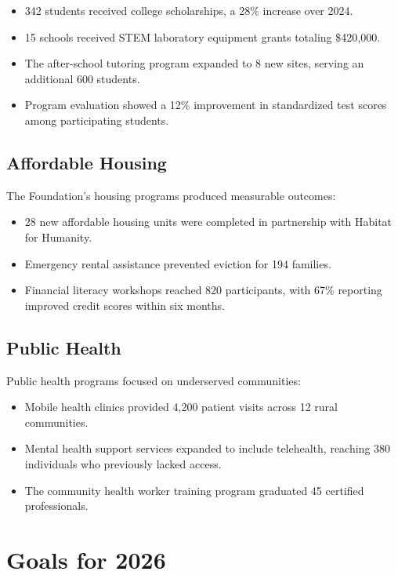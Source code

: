 \documentclass[
    language=english,
    doctype=article,
    institution=none,
]{../../omnilatex}
\begin{document}
\begin{itemize}
    \item 342 students received college scholarships, a 28\% increase
        over 2024.
    \item 15 schools received STEM laboratory equipment grants totaling
        \$420,000.
    \item The after-school tutoring program expanded to 8 new sites,
        serving an additional 600 students.
    \item Program evaluation showed a 12\% improvement in standardized
        test scores among participating students.
\end{itemize}

\subsection{Affordable Housing}

The Foundation's housing programs produced measurable outcomes:

\begin{itemize}
    \item 28 new affordable housing units were completed in partnership
        with Habitat for Humanity.
    \item Emergency rental assistance prevented eviction for 194 families.
    \item Financial literacy workshops reached 820 participants, with 67\%
        reporting improved credit scores within six months.
\end{itemize}

\subsection{Public Health}

Public health programs focused on underserved communities:

\begin{itemize}
    \item Mobile health clinics provided 4,200 patient visits across 12
        rural communities.
    \item Mental health support services expanded to include telehealth,
        reaching 380 individuals who previously lacked access.
    \item The community health worker training program graduated 45
        certified professionals.
\end{itemize}

\section{Goals for 2026}
\end{document}
